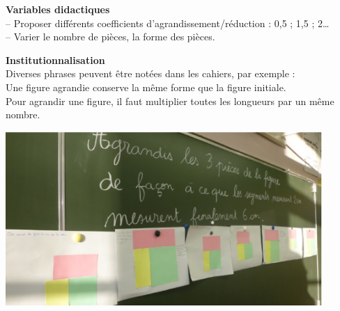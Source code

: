 \begin{exercice*}
   {\bf Variables didactiques} \\
   -- Proposer différents coefficients d’agrandissement/réduction : 0,5 ; 1,5 ; 2\dots \\
   -- Varier le nombre de pièces, la forme des pièces. \smallskip
   
   {\bf Institutionnalisation} \\
   Diverses phrases peuvent être notées dans les cahiers, par exemple : \\
   \og Une figure agrandie conserve la même forme que la figure initiale. \fg \\
   \og Pour agrandir une figure, il faut multiplier toutes les longueurs par un même nombre. \fg   
   \begin{center}
      \includegraphics[width=12cm]{Transversal/Images/Tra8_activite_brousseau_adapte}
   \end{center}
\end{exercice*}


